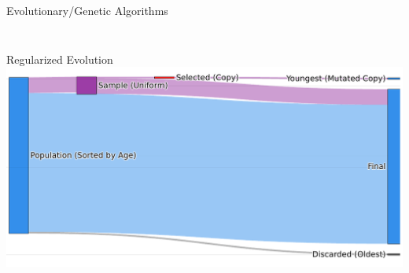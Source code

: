 \documentclass[aspectratio=169]{beamer}
\begin{document}
\begin{frame}{Evolutionary/Genetic Algorithms}
\begin{columns}[T]
\begin{column}{.6\linewidth}
\begin{figure}
          \end{figure}
      \end{column}
  \end{columns}
\end{frame}

\begin{frame}{Regularized Evolution \color{white} \cite{real2019regularized}}
    \includegraphics[width=0.95\linewidth, keepaspectratio]{figures/regev.pdf}
\end{frame}
\end{document}
